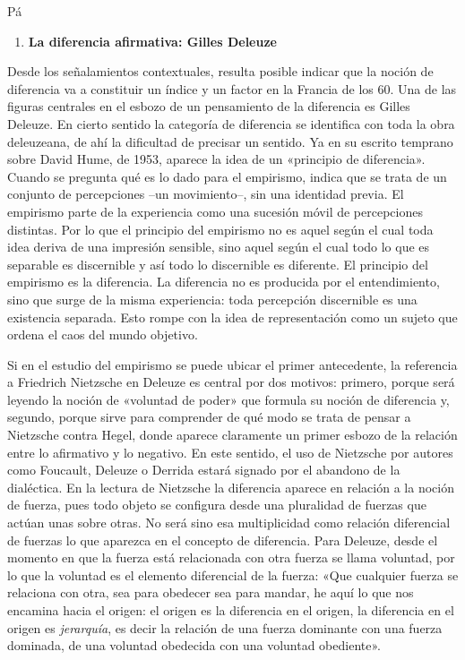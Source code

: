 Pá

\begin{enumerate}
\def\labelenumi{\arabic{enumi}.}
\item
  \textbf{La diferencia afirmativa: Gilles Deleuze}
\end{enumerate}

Desde los señalamientos contextuales, resulta posible indicar que la noción de diferencia va a constituir un índice y un factor en la Francia de los 60. Una de las figuras centrales en el esbozo de un pensamiento de la diferencia es Gilles Deleuze. En cierto sentido la categoría de diferencia se identifica con toda la obra deleuzeana, de ahí la dificultad de precisar un sentido. Ya en su escrito temprano sobre David Hume, de 1953, aparece la idea de un «principio de diferencia». Cuando se pregunta qué es lo dado para el empirismo, indica que se trata de un conjunto de percepciones --un movimiento--, sin una identidad previa. El empirismo parte de la experiencia como una sucesión móvil de percepciones distintas. Por lo que el principio del empirismo no es aquel según el cual toda idea deriva de una impresión sensible, sino aquel según el cual todo lo que es separable es discernible y así todo lo discernible es diferente. El principio del empirismo es la diferencia. La diferencia no es producida por el entendimiento, sino que surge de la misma experiencia: toda percepción discernible es una existencia separada. Esto rompe con la idea de representación como un sujeto que ordena el caos del mundo objetivo.

Si en el estudio del empirismo se puede ubicar el primer antecedente, la referencia a Friedrich Nietzsche en Deleuze es central por dos motivos: primero, porque será leyendo la noción de «voluntad de poder» que formula su noción de diferencia y, segundo, porque sirve para comprender de qué modo se trata de pensar a Nietzsche contra Hegel, donde aparece claramente un primer esbozo de la relación entre lo afirmativo y lo negativo. En este sentido, el uso de Nietzsche por autores como Foucault, Deleuze o Derrida estará signado por el abandono de la dialéctica. En la lectura de Nietzsche la diferencia aparece en relación a la noción de fuerza, pues todo objeto se configura desde una pluralidad de fuerzas que actúan unas sobre otras. No será sino esa multiplicidad como relación diferencial de fuerzas lo que aparezca en el concepto de diferencia. Para Deleuze, desde el momento en que la fuerza está relacionada con otra fuerza se llama voluntad, por lo que la voluntad es el elemento diferencial de la fuerza: «Que cualquier fuerza se relaciona con otra, sea para obedecer sea para mandar, he aquí lo que nos encamina hacia el origen: el origen es la diferencia en el origen, la diferencia en el origen es \emph{jerarquía}, es decir la relación de una fuerza dominante con una fuerza dominada, de una voluntad obedecida con una voluntad obediente».

